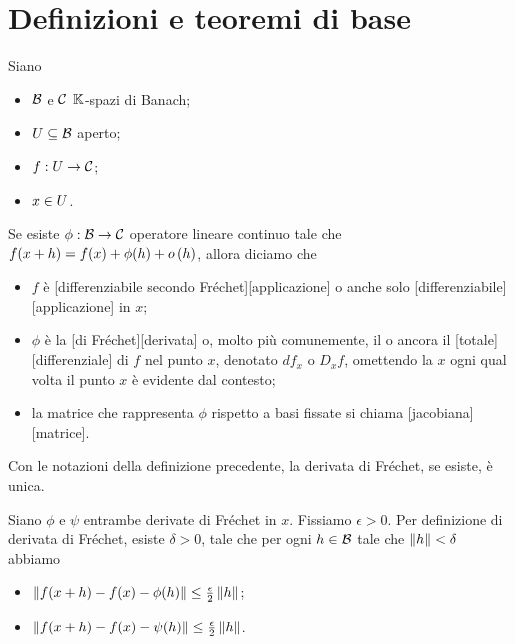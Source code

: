 \section{Definizioni e teoremi di base}\label{DefinizioniETeoremiDiBase}
\begin{Definition}
	Siano
	\begin{itemize}
		\item $\mathcal{B}$ e $\mathcal{C}$ $\mathbb{K}$-spazi di Banach;
		\item $U \subseteq \mathcal{B}$ aperto;
		\item $f: U \rightarrow \mathcal{C}$;
		\item $x \in U$.
	\end{itemize}
	Se esiste $\phi: \mathcal{B} \rightarrow \mathcal{C}$ operatore lineare continuo tale che $f(x + h) = f(x) + \phi(h) + o \left ( h \right )$, allora diciamo che
	\begin{itemize}
		\item $f$ \`e [differenziabile secondo Fr\'echet][applicazione] o anche solo [differenziabile][applicazione] in $x$;
		\item $\phi$ \`e la [di Fr\'echet][derivata] o, molto pi\`u comunemente, il  o ancora il [totale][differenziale] di $f$ nel punto $x$, denotato $df_x$ o $D_x f$, omettendo la $x$ ogni qual volta il punto $x$ \`e evidente dal contesto;
		\item la matrice che rappresenta $\phi$ rispetto a basi fissate si chiama [jacobiana][matrice].
	\end{itemize}
\end{Definition}
\begin{Theorem}
	Con le notazioni della definizione precedente, la derivata di Fr\'echet, se esiste, \`e unica.
\end{Theorem}
\Proof Siano $\phi$ e $\psi$ entrambe derivate di Fr\'echet in $x$. Fissiamo $\epsilon > 0$. Per definizione di derivata di Fr\'echet, esiste $\delta > 0$, tale che per ogni $h \in \mathcal{B}$ tale che $\Norm{h} < \delta$ abbiamo
\begin{itemize}
	\item $\Norm{f(x + h) - f(x) - \phi(h)} \leq \frac{\epsilon}{2}\Norm{h}$;
	\item $\Norm{f(x + h) - f(x) - \psi(h)} \leq \frac{\epsilon}{2}\Norm{h}$.
\end{itemize}
